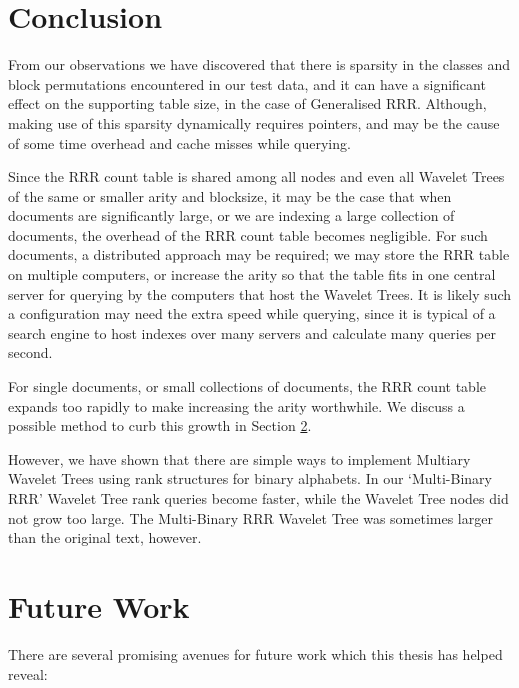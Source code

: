 \section{Conclusion}
\label{sec:conclusion}

From our observations we have discovered that there is sparsity in the classes 
and block permutations encountered in our test data, and it 
can have a significant effect on the supporting table size, in
the case of Generalised RRR. Although, making use of this sparsity dynamically
requires pointers, and may be the cause of some time overhead and cache misses 
while querying.

Since the RRR count table is shared among all nodes and even all Wavelet Trees
of the same or smaller arity and blocksize, it may be the case that when 
documents are significantly large, or we are indexing a large collection of 
documents, the overhead of the RRR count table becomes negligible. For such 
documents, a distributed approach may be required; we may store the RRR table on
multiple computers, or increase the arity so that the table fits in one central
server for querying by the computers that host the Wavelet Trees. It is likely 
such a configuration may need the extra speed while querying, since it is 
typical of a search engine to host indexes over many servers and 
calculate many queries per second.

For single documents, or small collections of documents, the RRR count table 
expands too rapidly to make increasing the arity worthwhile. We discuss a 
possible method to curb this growth in Section \ref{sec:future}.

However, we have shown that there are simple 
ways to implement Multiary Wavelet Trees using rank structures for binary 
alphabets. In our `Multi-Binary RRR' Wavelet Tree rank 
queries become faster, while the Wavelet Tree nodes did not grow too large. The
Multi-Binary RRR Wavelet Tree was sometimes larger than the original text, 
however.

\section{Future Work}
\label{sec:future}
There are several promising avenues for future work which this thesis has helped
reveal:

